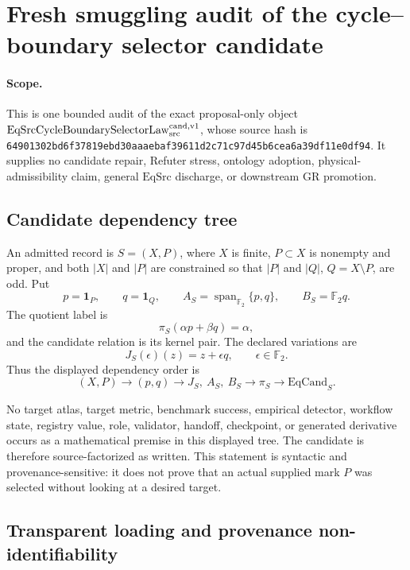 \section{Fresh smuggling audit of the cycle--boundary selector candidate}

\paragraph{Scope.}
This is one bounded audit of the exact proposal-only object
\(\mathrm{EqSrcCycleBoundarySelectorLaw}_{\rm src}^{\rm cand,v1}\), whose
source hash is
\texttt{64901302bd6f37819ebd30aaaebaf39611d2c71c97d45b6cea6a39df11e0df94}.
It supplies no candidate repair, Refuter stress, ontology adoption,
physical-admissibility claim, general \(\mathrm{EqSrc}\) discharge, or
downstream GR promotion.

\subsection{Candidate dependency tree}

An admitted record is \(S=(X,P)\), where \(X\) is finite, \(P\subset X\) is
nonempty and proper, and both \(|X|\) and \(|P|\) are constrained so that
\(|P|\) and \(|Q|\), \(Q=X\setminus P\), are odd.  Put
\[
 p=\mathbf 1_P,\qquad q=\mathbf 1_Q,\qquad
 A_S=\operatorname{span}_{\mathbb F_2}\{p,q\},\qquad
 B_S=\mathbb F_2q .
\]
The quotient label is
\[
 \pi_S(\alpha p+\beta q)=\alpha ,
\]
and the candidate relation is its kernel pair.  The declared variations are
\[
 J_S(\epsilon)(z)=z+\epsilon q,\qquad \epsilon\in\mathbb F_2 .
\]
Thus the displayed dependency order is
\[
 (X,P)\longrightarrow(p,q)\longrightarrow J_S,\ A_S,\ B_S
 \longrightarrow \pi_S\longrightarrow\mathrm{EqCand}_S .
\]

No target atlas, target metric, benchmark success, empirical detector,
workflow state, registry value, role, validator, handoff, checkpoint, or
generated derivative occurs as a mathematical premise in this displayed
tree.  The candidate is therefore source-factorized as written.  This
statement is syntactic and provenance-sensitive: it does not prove that an
actual supplied mark \(P\) was selected without looking at a desired target.

\subsection{Transparent loading and provenance non-identifiability}

